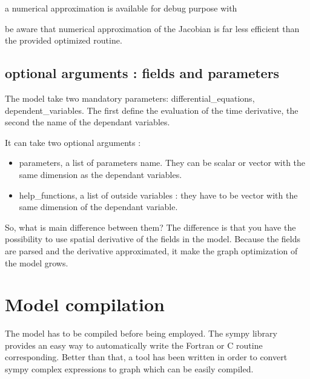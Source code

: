 \documentclass[letterpaper,10pt,english]{sphinxmanual}
\begin{document}
a numerical approximation is available for debug purpose with

\begin{sphinxVerbatim}[commandchars=\\\{\}]
 
\end{sphinxVerbatim}

be aware that numerical approximation of the Jacobian is far less efficient than the provided optimized routine.


\subsection{optional arguments : fields and parameters}
\label{\detokenize{overview:optional-arguments-fields-and-parameters}}
The model take two mandatory parameters: differential\_equations, dependent\_variables. The first define the evaluation of the time derivative, the second the name of the dependant variables.

It can take two optional arguments :
\begin{itemize}
\item {} 
parameters, a list of parameters name. They can be scalar or vector with the same dimension as the dependant variables.

\item {} 
help\_functions, a list of outside variables : they have to be vector with the same dimension of the dependant variable.

\end{itemize}

So, what is main difference between them? The difference is that you have the possibility to use spatial derivative of the fields in the model. Because the fields are parsed and the derivative approximated, it make the graph optimization of the model grows.


\section{Model compilation}
\label{\detokenize{overview:model-compilation}}
The model has to be compiled before being employed. The sympy library provides an easy way to automatically write the Fortran or C routine corresponding. Better than that, a tool has been written in order to convert sympy complex expressions to  graph which can be easily compiled.
\end{document}
